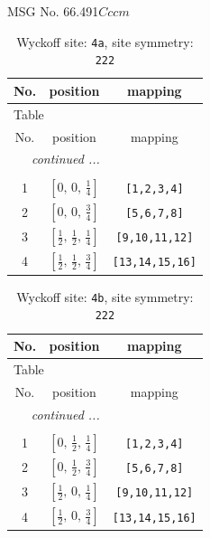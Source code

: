 \documentclass[fleqn,8pt]{jsarticle}
\begin{document}
\setcounter{MaxMatrixCols}{32}

\renewcommand{\tablename}{Table~}
\renewcommand{\figurename}{Figure~}
\begin{center}
\LARGE
MSG No. 66.491\quad$Cccm$
\end{center}
\renewcommand{\arraystretch}{1.2}
\begin{longtable}{ccc}
\caption{Wyckoff site: {\tt 4a}, site symmetry: {\tt 222}}
 \\
 \hline \hline
No. & position & mapping \\ \hline \endfirsthead

\multicolumn{2}{l}{\tablename\ \thetable{}} \\
 \hline \hline
No. & position & mapping \\ \hline \endhead

 \hline \hline
\multicolumn{2}{r}{\footnotesize\it continued ...} \\ \endfoot

 \hline \hline
\multicolumn{2}{r}{} \\ \endlastfoot

1 & $\left[ 0,\, 0,\, \frac{1}{4} \right]$ & {\tt [1,2,3,4]} \\ \hline
2 & $\left[ 0,\, 0,\, \frac{3}{4} \right]$ & {\tt [5,6,7,8]} \\ \hline
3 & $\left[ \frac{1}{2},\, \frac{1}{2},\, \frac{1}{4} \right]$ & {\tt [9,10,11,12]} \\ \hline
4 & $\left[ \frac{1}{2},\, \frac{1}{2},\, \frac{3}{4} \right]$ & {\tt [13,14,15,16]} \\
\end{longtable}
\renewcommand{\arraystretch}{1.2}
\begin{longtable}{ccc}
\caption{Wyckoff site: {\tt 4b}, site symmetry: {\tt 222}}
 \\
 \hline \hline
No. & position & mapping \\ \hline \endfirsthead

\multicolumn{2}{l}{\tablename\ \thetable{}} \\
 \hline \hline
No. & position & mapping \\ \hline \endhead

 \hline \hline
\multicolumn{2}{r}{\footnotesize\it continued ...} \\ \endfoot

 \hline \hline
\multicolumn{2}{r}{} \\ \endlastfoot

1 & $\left[ 0,\, \frac{1}{2},\, \frac{1}{4} \right]$ & {\tt [1,2,3,4]} \\ \hline
2 & $\left[ 0,\, \frac{1}{2},\, \frac{3}{4} \right]$ & {\tt [5,6,7,8]} \\ \hline
3 & $\left[ \frac{1}{2},\, 0,\, \frac{1}{4} \right]$ & {\tt [9,10,11,12]} \\ \hline
4 & $\left[ \frac{1}{2},\, 0,\, \frac{3}{4} \right]$ & {\tt [13,14,15,16]} \\
\end{longtable}
\end{document}
